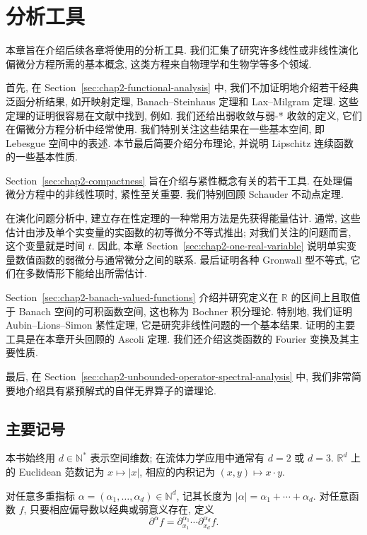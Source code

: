 \section{分析工具}
\label{chap:analysis-tools}

本章旨在介绍后续各章将使用的分析工具. 我们汇集了研究许多线性或非线性演化偏微分方程所需的基本概念, 这类方程来自物理学和生物学等多个领域.

首先, 在 Section~\ref{sec:chap2-functional-analysis} 中, 我们不加证明地介绍若干经典泛函分析结果, 如开映射定理, Banach--Steinhaus 定理和 Lax--Milgram 定理. 这些定理的证明很容易在文献中找到, 例如. 我们还给出弱收敛与弱-* 收敛的定义, 它们在偏微分方程分析中经常使用. 我们特别关注这些结果在一些基本空间, 即 Lebesgue 空间中的表述. 本节最后简要介绍分布理论, 并说明 Lipschitz 连续函数的一些基本性质.

Section~\ref{sec:chap2-compactness} 旨在介绍与紧性概念有关的若干工具. 在处理偏微分方程中的非线性项时, 紧性至关重要. 我们特别回顾 Schauder 不动点定理.

在演化问题分析中, 建立存在性定理的一种常用方法是先获得能量估计. 通常, 这些估计由涉及单个实变量的实函数的初等微分不等式推出; 对我们关注的问题而言, 这个变量就是时间 $t$. 因此, 本章 Section~\ref{sec:chap2-one-real-variable} 说明单实变量数值函数的弱微分与通常微分之间的联系. 最后证明各种 Gronwall 型不等式, 它们在多数情形下能给出所需估计.

Section~\ref{sec:chap2-banach-valued-functions} 介绍并研究定义在 $\mathbb{R}$ 的区间上且取值于 Banach 空间的可积函数空间, 这也称为 Bochner 积分理论. 特别地, 我们证明 Aubin--Lions--Simon 紧性定理, 它是研究非线性问题的一个基本结果. 证明的主要工具是在本章开头回顾的 Ascoli 定理. 我们还介绍这类函数的 Fourier 变换及其主要性质.

最后, 在 Section~\ref{sec:chap2-unbounded-operator-spectral-analysis} 中, 我们非常简要地介绍具有紧预解式的自伴无界算子的谱理论.

\subsection{主要记号}
\label{sec:chap2-main-notation}

本书始终用 $d\in\mathbb{N}^*$ 表示空间维数; 在流体力学应用中通常有 $d=2$ 或 $d=3$. $\mathbb{R}^d$ 上的 Euclidean 范数记为 $x\mapsto|x|$, 相应的内积记为 $(x,y)\mapsto x\cdot y$.

对任意多重指标 $\alpha=(\alpha_1,\ldots,\alpha_d)\in\mathbb{N}^d$, 记其长度为 $|\alpha|=\alpha_1+\cdots+\alpha_d$. 对任意函数 $f$, 只要相应偏导数以经典或弱意义存在, 定义
\[
  \partial^\alpha f=\partial_{x_1}^{\alpha_1}\cdots\partial_{x_d}^{\alpha_d}f.
\]

